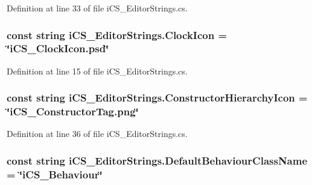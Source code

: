 Definition at line 33 of file i\+C\+S\+\_\+\+Editor\+Strings.\+cs.

\hypertarget{classi_c_s___editor_strings_a41db2804cc955b9d5ce03bd318ed2e6c}{
\subsubsection[{Clock\+Icon}]{\setlength{\rightskip}{0pt plus 5cm}const string i\+C\+S\+\_\+\+Editor\+Strings.\+Clock\+Icon = \char`\"{}i\+C\+S\+\_\+\+Clock\+Icon.\+psd\char`\"{}}}\label{classi_c_s___editor_strings_a41db2804cc955b9d5ce03bd318ed2e6c}


Definition at line 15 of file i\+C\+S\+\_\+\+Editor\+Strings.\+cs.

\hypertarget{classi_c_s___editor_strings_acd0b68646b2dce5786106559c055857c}{
\subsubsection[{Constructor\+Hierarchy\+Icon}]{\setlength{\rightskip}{0pt plus 5cm}const string i\+C\+S\+\_\+\+Editor\+Strings.\+Constructor\+Hierarchy\+Icon = \char`\"{}i\+C\+S\+\_\+\+Constructor\+Tag.\+png\char`\"{}}}\label{classi_c_s___editor_strings_acd0b68646b2dce5786106559c055857c}


Definition at line 36 of file i\+C\+S\+\_\+\+Editor\+Strings.\+cs.

\hypertarget{classi_c_s___editor_strings_a3bba1e95fc209c83fc8f381fcca39ba7}{
\subsubsection[{Default\+Behaviour\+Class\+Name}]{\setlength{\rightskip}{0pt plus 5cm}const string i\+C\+S\+\_\+\+Editor\+Strings.\+Default\+Behaviour\+Class\+Name = \char`\"{}i\+C\+S\+\_\+\+Behaviour\char`\"{}}}\label{classi_c_s___editor_strings_a3bba1e95fc209c83fc8f381fcca39ba7}


